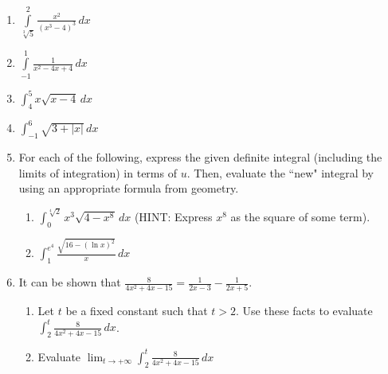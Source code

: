 \documentclass[12pt]{article}
\newif\ifans
\begin{document}
\begin{enumerate}
\ifans{\fbox{$\frac{1}{2}(\ln{3}-\ln{2})$}} \fi

\item $\int\limits_{\sqrt[3]{5}}^{2}\frac{x^2}{(x^3-4)^3}\,dx$ 

\ifans{\fbox{$\frac{5}{32}$}} \fi

\item $\int\limits_{-1}^{1}\frac{1}{x^2-4x+4}\,dx$ 

\ifans{\fbox{$\frac{2}{3}$}} \fi

\item $\int_4^5 x\sqrt{x-4} \,dx$

\ifans{\fbox{$\frac{46}{15}$}} \fi

\item $\int_{-1}^6 \sqrt{3+|x|} \,dx$

\ifans{\fbox{$\frac{70}{3}-4\sqrt{3}$}} \fi

\item For each of the following, express the given definite integral (including the limits of integration) in terms of $u$.  Then, evaluate the ``new" integral by using an appropriate formula from geometry.

\begin{enumerate}

\item $\int_0^{\sqrt[4]{2}} x^3\sqrt{4-x^8} \,dx$ (HINT: Express $x^8$ as the square of some term).

\ifans{\fbox{$\frac{\pi}{4}$}} \fi

\item $\int_1^{e^4} \frac{\sqrt{16-(\ln{x})^2}}{x} \,dx$

\ifans{\fbox{$4\pi$}} \fi

\end{enumerate}

\item It can be shown that $\frac{8}{4x^2+4x-15}=\frac{1}{2x-3}-\frac{1}{2x+5}$.

\begin{enumerate}

\item Let $t$ be a fixed constant such that $t>2$.  Use these facts to evaluate $\int_2^t \frac{8}{4x^2+4x-15} \,dx$.

\ifans{\fbox{$\frac{1}{2}\ln{\left|\frac{2t-3}{2t+5}\right|}+\ln{3}$}} \fi

\item Evaluate $\lim_{t \rightarrow +\infty} \int_2^t \frac{8}{4x^2+4x-15} \,dx$

\ifans{\fbox{$\ln{3}$}} \fi

\end{enumerate}

\end{enumerate}
\end{document}
